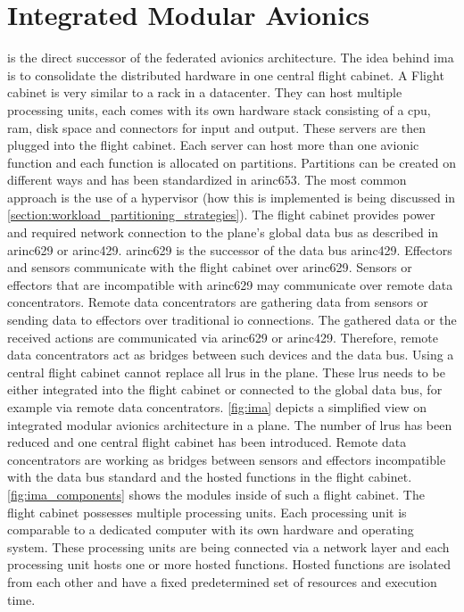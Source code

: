 \documentclass[titlepage]{report}
\begin{document}
\section{Integrated Modular Avionics}\label{section:integrated_modular_avionics}
 is the direct successor of the federated avionics architecture. The idea behind \gls{ima}
is to consolidate the distributed hardware in one central flight cabinet. A Flight cabinet is very similar
to a rack in a datacenter. They can host multiple processing units, each comes with its own hardware stack
consisting of a \gls{cpu}, \gls{ram}, disk space and connectors for input and output\cite{prisaznuk1992integrated}. These servers are then plugged
into the flight cabinet. Each server can host more than one avionic function and each function is allocated on partitions.
Partitions can be created on different ways and has been standardized in \gls{arinc653}\cite{vanderleest2010arinc}. The most common approach
is the use of a hypervisor (how this is implemented is being discussed in \autoref{section:workload_partitioning_strategies}). 
The flight cabinet provides power and required network connection to the plane's global data bus
as described in \gls{arinc629}\cite{isik2010arinc} or \gls{arinc429}\cite{fuchs2012evolution}. \gls{arinc629} is the successor of the data bus \gls{arinc429}.
Effectors and sensors communicate with the flight cabinet over \gls{arinc629}\cite{prisaznuk1992integrated}.
Sensors or effectors that are incompatible with \gls{arinc629} may communicate over remote data concentrators. Remote data concentrators are gathering data from sensors
or sending data to effectors over traditional \gls{io} connections. The gathered data or the received actions are communicated via \gls{arinc629} or \gls{arinc429}. Therefore,
remote data concentrators act as bridges between such devices and the data bus.
Using a central flight cabinet cannot replace all \glspl{lru} in the plane\cite{watkins2007transitioning}. These \glspl{lru} needs to be either integrated into the flight cabinet
or connected to the global data bus, for example via remote data concentrators. \autoref{fig:ima} depicts a simplified view on integrated modular avionics architecture in a plane.
The number of \glspl{lru} has been reduced and one central flight cabinet has been introduced. Remote data concentrators are working as bridges between sensors and effectors incompatible
with the data bus standard and the hosted functions in the flight cabinet. \autoref{fig:ima_components} shows the modules inside of such a flight cabinet. The flight cabinet
possesses multiple processing units. Each processing unit is comparable to a dedicated computer with its own hardware and operating system. These processing units
are being connected via a network layer and each processing unit hosts one or more hosted functions. Hosted functions are isolated from each other and have
a fixed predetermined set of resources and execution time.
\end{document}
